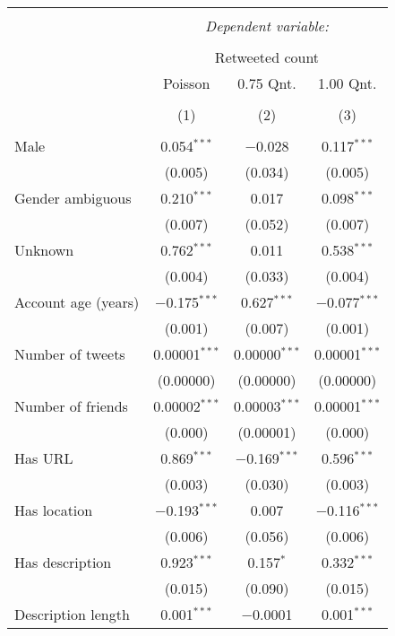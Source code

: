 
\begin{table}[!htbp] \centering 
  \caption{} 
  \label{} 
\begin{tabular}{@{\extracolsep{5pt}}lccc} 
\\[-1.8ex]\hline 
\hline \\[-1.8ex] 
 & \multicolumn{3}{c}{\textit{Dependent variable:}} \\ 
\cline{2-4} 
\\[-1.8ex] & \multicolumn{3}{c}{Retweeted count} \\ 
 & Poisson & 0.75 Qnt. & 1.00 Qnt. \\ 
\\[-1.8ex] & (1) & (2) & (3)\\ 
\hline \\[-1.8ex] 
 Male & 0.054$^{***}$ & $-$0.028 & 0.117$^{***}$ \\ 
  & (0.005) & (0.034) & (0.005) \\ 
  Gender ambiguous & 0.210$^{***}$ & 0.017 & 0.098$^{***}$ \\ 
  & (0.007) & (0.052) & (0.007) \\ 
  Unknown & 0.762$^{***}$ & 0.011 & 0.538$^{***}$ \\ 
  & (0.004) & (0.033) & (0.004) \\ 
  Account age (years) & $-$0.175$^{***}$ & 0.627$^{***}$ & $-$0.077$^{***}$ \\ 
  & (0.001) & (0.007) & (0.001) \\ 
  Number of tweets & 0.00001$^{***}$ & 0.00000$^{***}$ & 0.00001$^{***}$ \\ 
  & (0.00000) & (0.00000) & (0.00000) \\ 
  Number of friends & 0.00002$^{***}$ & 0.00003$^{***}$ & 0.00001$^{***}$ \\ 
  & (0.000) & (0.00001) & (0.000) \\ 
  Has URL & 0.869$^{***}$ & $-$0.169$^{***}$ & 0.596$^{***}$ \\ 
  & (0.003) & (0.030) & (0.003) \\ 
  Has location & $-$0.193$^{***}$ & 0.007 & $-$0.116$^{***}$ \\ 
  & (0.006) & (0.056) & (0.006) \\ 
  Has description & 0.923$^{***}$ & 0.157$^{*}$ & 0.332$^{***}$ \\ 
  & (0.015) & (0.090) & (0.015) \\ 
  Description length & 0.001$^{***}$ & $-$0.0001 & 0.001$^{***}$ \\ 

\end{tabular}
\end{table}
